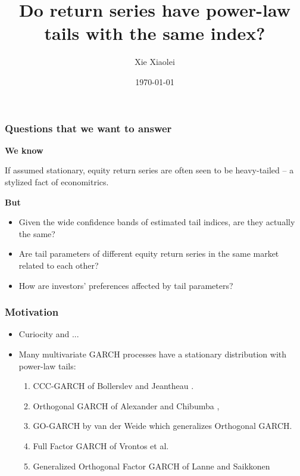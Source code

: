 \documentclass{beamer}
\title{Do return series have power-law tails with the same index?}
\author{Xie Xiaolei} %
\institute[UCPH] %
{
University of Copenhagen \\ %
\medskip
\textit{xie@math.ku.dk} %
}
\date{\today} %
\begin{document}
\begin{frame}
\titlepage %
\end{frame}


\begin{frame}
  \frametitle{Questions that we want to answer}
  \textcolor[HTML]{990033}{\bf We know}

  If assumed stationary, equity return series are often seen to be
  heavy-tailed -- a stylized fact of economitrics.
  
  \textcolor[HTML]{990033}{\bf But}
  \begin{itemize}
    \item Given the wide confidence bands of estimated tail indices,
      are they actually the same?
    \item Are tail parameters of different equity return series in the same
      market related to each other?
    \item How are investors' preferences affected by tail parameters?
  \end{itemize}
\end{frame}

\begin{frame}
  \frametitle{Motivation}
  \begin{itemize}
  \item Curiocity and ...
    \item Many multivariate GARCH processes have a stationary
      distribution with power-law tails:
      \begin{enumerate}
        \item CCC-GARCH of Bollerslev \cite{bollerslev:1990} and
          Jeantheau \cite{jeantheau:1998}.
        \item Orthogonal GARCH of
          Alexander and Chibumba \cite{alexander:chibumba:1996},
        \item GO-GARCH by van der Weide \cite{Weide2002} which
          generalizes Orthogonal GARCH.
        \item Full Factor GARCH of Vrontos et
          al. \cite{vrontos2003full}
        \item Generalized Orthogonal Factor GARCH of Lanne and
          Saikkonen  \cite{lanne2007modelling}
      \end{enumerate}
  \end{itemize}
\end{frame}
\end{document}
